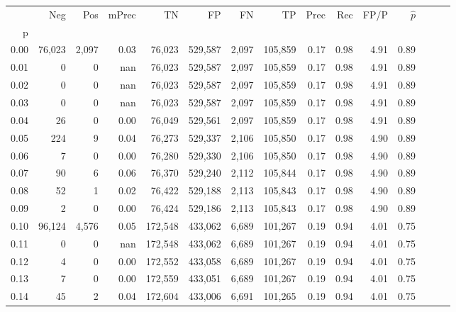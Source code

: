 \begin{tabular}{rrrrrrrrrrrrrrr}
\toprule
{} &     Neg &     Pos & mPrec &       TN &       FP &       FN &       TP &  Prec &   Rec &  FP/P & $\hat{p}$ \\
p    &         &         &       &          &          &          &          &       &       &       &           \\
\midrule
0.00 &  76,023 &   2,097 &  0.03 &   76,023 &  529,587 &    2,097 &  105,859 &  0.17 &  0.98 &  4.91 &      0.89 \\
0.01 &       0 &       0 &   nan &   76,023 &  529,587 &    2,097 &  105,859 &  0.17 &  0.98 &  4.91 &      0.89 \\
0.02 &       0 &       0 &   nan &   76,023 &  529,587 &    2,097 &  105,859 &  0.17 &  0.98 &  4.91 &      0.89 \\
0.03 &       0 &       0 &   nan &   76,023 &  529,587 &    2,097 &  105,859 &  0.17 &  0.98 &  4.91 &      0.89 \\
0.04 &      26 &       0 &  0.00 &   76,049 &  529,561 &    2,097 &  105,859 &  0.17 &  0.98 &  4.91 &      0.89 \\
0.05 &     224 &       9 &  0.04 &   76,273 &  529,337 &    2,106 &  105,850 &  0.17 &  0.98 &  4.90 &      0.89 \\
0.06 &       7 &       0 &  0.00 &   76,280 &  529,330 &    2,106 &  105,850 &  0.17 &  0.98 &  4.90 &      0.89 \\
0.07 &      90 &       6 &  0.06 &   76,370 &  529,240 &    2,112 &  105,844 &  0.17 &  0.98 &  4.90 &      0.89 \\
0.08 &      52 &       1 &  0.02 &   76,422 &  529,188 &    2,113 &  105,843 &  0.17 &  0.98 &  4.90 &      0.89 \\
0.09 &       2 &       0 &  0.00 &   76,424 &  529,186 &    2,113 &  105,843 &  0.17 &  0.98 &  4.90 &      0.89 \\
0.10 &  96,124 &   4,576 &  0.05 &  172,548 &  433,062 &    6,689 &  101,267 &  0.19 &  0.94 &  4.01 &      0.75 \\
0.11 &       0 &       0 &   nan &  172,548 &  433,062 &    6,689 &  101,267 &  0.19 &  0.94 &  4.01 &      0.75 \\
0.12 &       4 &       0 &  0.00 &  172,552 &  433,058 &    6,689 &  101,267 &  0.19 &  0.94 &  4.01 &      0.75 \\
0.13 &       7 &       0 &  0.00 &  172,559 &  433,051 &    6,689 &  101,267 &  0.19 &  0.94 &  4.01 &      0.75 \\
0.14 &      45 &       2 &  0.04 &  172,604 &  433,006 &    6,691 &  101,265 &  0.19 &  0.94 &  4.01 &      0.75 \\

\end{tabular}
